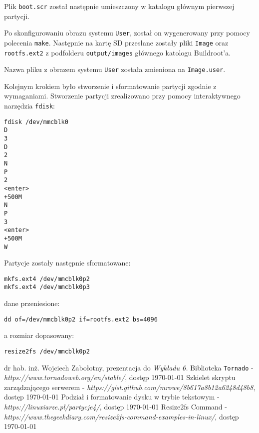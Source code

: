 \documentclass{article}
\begin{document}
Plik \texttt{boot.scr} został następnie umieszczony w katalogu głównym pierwszej partycji.

Po skonfigurowaniu obrazu systemu \texttt{User}, został on wygenerowany przy pomocy polecenia \texttt{make}. Następnie na kartę SD przesłane zostały pliki \texttt{Image} oraz \texttt{rootfs.ext2} z podfolderu \texttt{output/images} głównego katologu Buildroot'a.

Nazwa pliku z obrazem systemu \texttt{User} została zmieniona na \texttt{Image.user}.

Kolejnym krokiem było stworzenie i sformatowanie partycji zgodnie z wymaganiami. Stworzenie partycji zrealizowano przy pomocy interaktywnego narzędzia \texttt{fdisk}:

\begin{verbatim}
fdisk /dev/mmcblk0
D
3
D
2
N
P
2
<enter>
+500M
N
P
3
<enter>
+500M
W
\end{verbatim}

Partycje zostały następnie sformatowane:

\begin{verbatim}
mkfs.ext4 /dev/mmcblk0p2
mkfs.ext4 /dev/mmcblk0p3
\end{verbatim}

dane przeniesione:

\begin{verbatim}
dd of=/dev/mmcblk0p2 if=rootfs.ext2 bs=4096
\end{verbatim}

a rozmiar dopasowany:

\begin{verbatim}
resize2fs /dev/mmcblk0p2
\end{verbatim}


\begin{thebibliography}{9}
 dr hab. inż. Wojciech Zabołotny, prezentacja do \textit{Wykładu 6.}
 Biblioteka \texttt{Tornado} - \textit{https://www.tornadoweb.org/en/stable/}, dostęp \today
{} Szkielet skryptu zarządzającego serwerem - \textit{https://gist.github.com/mrowe/8b617a8b12a6248d48b8}, dostęp \today
{} Podział i formatowanie dysku w trybie tekstowym - \textit{https://linuxiarze.pl/partycje4/}, dostęp \today
{} Resize2fs Command - \textit{https://www.thegeekdiary.com/resize2fs-command-examples-in-linux/}, dostęp \today
\end{thebibliography}
\end{document}
